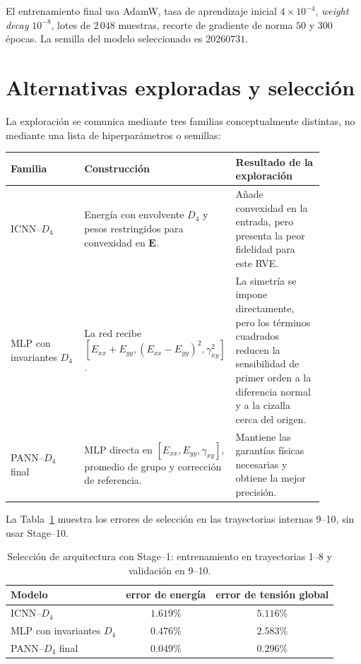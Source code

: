 \documentclass[11pt,a4paper]{article}
\newcommand{\E}{\ensuremath{\bm E}}
\newcommand{\Dfour}{\ensuremath{D_4}}
\newcommand{\PANN}{\textsc{PANN--}\Dfour}
\newcommand{\ICNN}{\textsc{ICNN--}\Dfour}
\begin{document}
El entrenamiento final usa AdamW, tasa de aprendizaje inicial
\(4\times10^{-4}\), \emph{weight decay} \(10^{-8}\), lotes de \(2\,048\)
muestras, recorte de gradiente de norma \(50\) y \(300\) épocas. La semilla
del modelo seleccionado es \(20260731\).

\section{Alternativas exploradas y selección}

La exploración se comunica mediante tres familias conceptualmente distintas,
no mediante una lista de hiperparámetros o semillas:

\begin{center}
\small
\begin{tabular}{p{0.26\linewidth}p{0.31\linewidth}p{0.31\linewidth}}
\toprule
Familia & Construcción & Resultado de la exploración\\
\midrule
\ICNN{} &
Energía con envolvente \(\Dfour\) y pesos restringidos para convexidad en
\(\E\). &
Añade convexidad en la entrada, pero presenta la peor fidelidad para este RVE.\\[2pt]
MLP con invariantes \(\Dfour\) &
La red recibe
\([E_{xx}+E_{yy},(E_{xx}-E_{yy})^2,\gamma_{xy}^2]\). &
La simetría se impone directamente, pero los términos cuadrados reducen la
sensibilidad de primer orden a la diferencia normal y a la cizalla cerca del
origen.\\[2pt]
\PANN{} final &
MLP directa en \([E_{xx},E_{yy},\gamma_{xy}]\), promedio de grupo y
corrección de referencia. &
Mantiene las garantías físicas necesarias y obtiene la mejor precisión.\\
\bottomrule
\end{tabular}
\end{center}

La Tabla~\ref{tab:selection} muestra los errores de selección en las
trayectorias internas 9--10, sin usar Stage--10.
\begin{table}[ht]
\centering
\caption{Selección de arquitectura con Stage--1: entrenamiento en
trayectorias 1--8 y validación en 9--10.}
\label{tab:selection}
\begin{tabular}{lcc}
\toprule
Modelo & error de energía & error de tensión global\\
\midrule
\ICNN{} & \(1.619\%\) & \(5.116\%\)\\
MLP con invariantes \(\Dfour\) & \(0.476\%\) & \(2.583\%\)\\
\PANN{} final & \(\mathbf{0.049\%}\) & \(\mathbf{0.296\%}\)\\
\bottomrule
\end{tabular}
\end{table}
\end{document}
